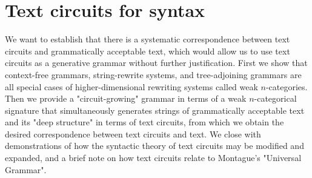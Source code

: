 



\maketitle%

\tableofcontents{}

\chapter{Text circuits for syntax}\label{chapter:textcircuits}
We want to establish that there is a systematic correspondence between text circuits and grammatically acceptable text, which would allow us to use text circuits as a generative grammar without further justification. First we show that context-free grammars, string-rewrite systems, and tree-adjoining grammars are all special cases of higher-dimensional rewriting systems called weak $n$-categories. Then we provide a "circuit-growing" grammar in terms of a weak $n$-categorical signature that simultaneously generates strings of grammatically acceptable text and its "deep structure" in terms of text circuits, from which we obtain the desired correspondence between text circuits and text. We close with demonstrations of how the syntactic theory of text circuits may be modified and expanded, and a brief note on how text circuits relate to Montague's "Universal Grammar".

\newpage

%





